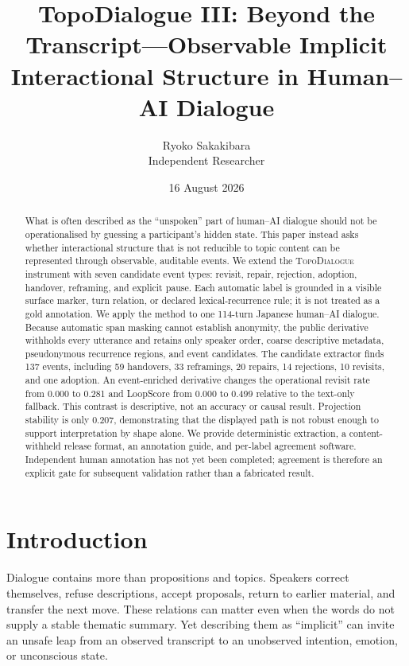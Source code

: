 \documentclass[11pt]{article}
\title{TopoDialogue III: Beyond the Transcript---Observable Implicit\\
Interactional Structure in Human--AI Dialogue}
\author{Ryoko Sakakibara\\Independent Researcher}
\date{16 August 2026}
\newcommand{\system}{\textsc{TopoDialogue}}
\begin{document}
\maketitle

\begin{abstract}
What is often described as the ``unspoken'' part of human--AI dialogue should
not be operationalised by guessing a participant's hidden state. This paper
instead asks whether interactional structure that is not reducible to topic
content can be represented through observable, auditable events. We extend the
\system{} instrument with seven candidate event types: revisit, repair,
rejection, adoption, handover, reframing, and explicit pause. Each automatic
label is grounded in a visible surface marker, turn relation, or declared
lexical-recurrence rule; it is not treated as a gold annotation. We apply the
method to one 114-turn Japanese human--AI dialogue. Because automatic span
masking cannot establish anonymity, the public derivative withholds every
utterance and retains only speaker order, coarse descriptive metadata,
pseudonymous recurrence regions, and event candidates. The candidate extractor
finds 137 events, including 59 handovers, 33 reframings, 20 repairs, 14
rejections, 10 revisits, and one adoption. An event-enriched derivative changes
the operational revisit rate from 0.000 to 0.281 and LoopScore from 0.000 to
0.499 relative to the text-only fallback. This contrast is descriptive, not an
accuracy or causal result. Projection stability is only 0.207, demonstrating
that the displayed path is not robust enough to support interpretation by
shape alone. We provide deterministic extraction, a content-withheld release
format, an annotation guide, and per-label agreement software. Independent
human annotation has not yet been completed; agreement is therefore an explicit
gate for subsequent validation rather than a fabricated result.
\end{abstract}

\section{Introduction}

Dialogue contains more than propositions and topics. Speakers correct
themselves, refuse descriptions, accept proposals, return to earlier material,
and transfer the next move. These relations can matter even when the words do
not supply a stable thematic summary. Yet describing them as ``implicit'' can
invite an unsafe leap from an observed transcript to an unobserved intention,
emotion, or unconscious state.
\end{document}
